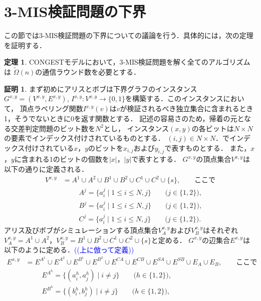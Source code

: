 \documentclass[12pt]{thesis}
\newcommand{\Izumi}[1]{\textcolor{blue}{(#1)}}
\newcommand{\CONGEST}{\textsf{CONGEST}}
\theoremstyle{definition}
\newtheorem{theorem}{定理}[chapter]
\newtheorem*{prf*}{証明}
\begin{document}
\section{3-MIS検証問題の下界}
この節では3-MIS検証問題の下界についての議論を行う．具体的には，次の定理を証明する．
\begin{theorem}
{\CONGEST}モデルにおいて，3-MIS検証問題を解く全てのアルゴリズムは
$\tilde{\Omega} (n)$の通信ラウンド数を必要とする．
\end{theorem}
\begin{prf*}
まず初めにアリスとボブは下界グラフのインスタンス$G^{x,y} = (V^{x,y}, E^{x,y})$, 
$I^{x,y} : V^{x,y} \to \{0, 1\}$を構築する．このインスタンスにおいて，
頂点ラベリング関数$I^{x,y}(v)$は$v$が検証されるべき独立集合に含まれるとき1，そうでないときに0を返す関数とする．
記述の容易さのため，帰着の元となる交差判定問題のビット数を$N^2$とし，
インスタンス$(x, y)$の各ビットは$N\times N$の要素でインデックス付けされているものとする．
$(i, j) \in N \times N$．でインデックス付けされている$x$，$y$のビットを$x_{i,j}$および$y_{i,j}$で表すものとする．
また，$x$，$y$に含まれる1のビットの個数を$|x|$，$|y|$で表すとする．
$G^{x,y}$の頂点集合$V^{x,y}$は以下の通りに定義される．
\begin{align*}
V^{x,y} &= A^{1} \cup A^{2} \cup B^{1} \cup B^{2} \cup C^{1} \cup C^{2} \cup \{s\}, \quad \quad \text{ここで}\\
&\phantom{=} \quad A^{j} = \{a^{j}_{i} \mid 1\leq i \leq N, j\} \quad \quad \text{($j \in \{1, 2\}$)}, \\
&\phantom{=} \quad B^{j} = \{a^{j}_{i} \mid 1\leq i \leq N, j\} \quad \quad \text{($j \in \{1, 2\}$)}, \\
&\phantom{=} \quad C^{j} = \{a^{j}_{i} \mid 1\leq i \leq N, j\} \quad \quad \text{($j \in \{1, 2\}$)}.
\end{align*}
アリス及びボブがシミュレーションする頂点集合$V^{x,y}_{A}$および$V^{x,y}_{B}$はそれぞれ
$V^{x,y}_{A} = A^{1} \cup A^{2}$，$V^{x,y}_{B} = B^{1} \cup B^{2} \cup C^{1} \cup C^{2} \cup \{s\}$と定める．
$G^{x,y}$の辺集合$E^{x,y}$は以下のように定める．\Izumi{(上に倣って定義)}
\begin{align*}
E^{x,y} &= E^{A^{1}} \cup E^{A^{2}} \cup E^{B^{1}} \cup E^{B^{2}} 
\cup E^{CA} \cup E^{CB} \cup E^{SA} \cup E^{SB} \cup E_{A} \cup E_{B}, \quad \quad \text{ここで}\\
&\phantom{=} \quad E^{A^{h}} = \{(a^{h}_{i}, a^{h}_{j})  \mid i \neq j\} \quad \quad \text{($h \in \{1, 2\}$)}, \\
&\phantom{=} \quad E^{B^{h}} = \{(b^{h}_{i}, b^{h}_{j})  \mid i \neq j\} \quad \quad \text{($h \in \{1, 2\}$)}, \\

\end{align*}
\end{prf*}
\end{document}
